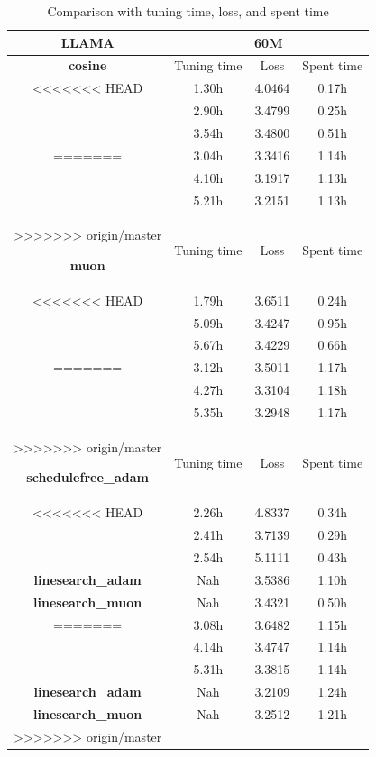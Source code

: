 \begin{table}[htbp]
\centering
\begin{tabular}{c|c|c|c}
\hline
\textbf{LLAMA} & \multicolumn{3}{c}{60M} \\
\hline

\textbf{cosine} & Tuning time & Loss & Spent time \\
\hline
<<<<<<< HEAD
 & 1.30h & 4.0464 & 0.17h \\
\hline
 & 2.90h & 3.4799 & 0.25h \\
\hline
 & 3.54h & 3.4800 & 0.51h \\
=======
 & 3.04h & 3.3416 & 1.14h \\
\hline
 & 4.10h & 3.1917 & 1.13h \\
\hline
 & 5.21h & 3.2151 & 1.13h \\
>>>>>>> origin/master
\hline

\textbf{muon} & Tuning time & Loss & Spent time \\
\hline
<<<<<<< HEAD
 & 1.79h & 3.6511 & 0.24h \\
\hline
 & 5.09h & 3.4247 & 0.95h \\
\hline
 & 5.67h & 3.4229 & 0.66h \\
=======
 & 3.12h & 3.5011 & 1.17h \\
\hline
 & 4.27h & 3.3104 & 1.18h \\
\hline
 & 5.35h & 3.2948 & 1.17h \\
>>>>>>> origin/master
\hline

\textbf{schedulefree_adam} & Tuning time & Loss & Spent time \\
\hline
<<<<<<< HEAD
 & 2.26h & 4.8337 & 0.34h \\
\hline
 & 2.41h & 3.7139 & 0.29h \\
\hline
 & 2.54h & 5.1111 & 0.43h \\
\hline

\textbf{linesearch_adam} & Nah & 3.5386 & 1.10h \\
\hline
\textbf{linesearch_muon} & Nah & 3.4321 & 0.50h \\
=======
 & 3.08h & 3.6482 & 1.15h \\
\hline
 & 4.14h & 3.4747 & 1.14h \\
\hline
 & 5.31h & 3.3815 & 1.14h \\
\hline

\textbf{linesearch_adam} & Nah & 3.2109 & 1.24h \\
\hline
\textbf{linesearch_muon} & Nah & 3.2512 & 1.21h \\
>>>>>>> origin/master
\hline
\end{tabular}
\caption{Comparison with tuning time, loss, and spent time}
\end{table}
